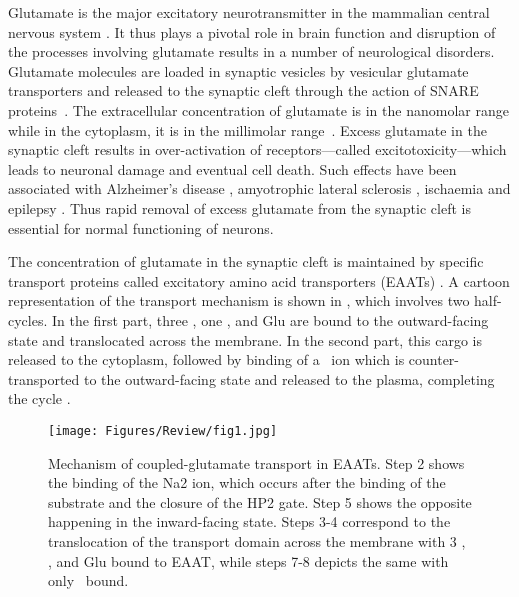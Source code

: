 Glutamate is the major excitatory neurotransmitter in the mammalian central 
nervous system \cite{Danbolt2001}. It thus plays a pivotal role in brain 
function and disruption of the processes involving glutamate results in a 
number of neurological disorders. Glutamate molecules are loaded in synaptic 
vesicles by vesicular glutamate transporters and released to the synaptic cleft 
through the action of SNARE proteins~\cite{ElMestikawy2011}.  The extracellular 
concentration of glutamate is in the nanomolar range while in the cytoplasm, it 
is in the millimolar range~\cite{Herman2007}. Excess glutamate in the synaptic 
cleft results in over-activation of receptors---called excitotoxicity---which 
leads to neuronal damage and eventual cell death. Such effects have been 
associated with Alzheimer's disease \cite{Hynd2004}, amyotrophic lateral 
sclerosis \cite{Rothstein1992}, ischaemia \cite{Rossi2000} and epilepsy 
\cite{During1993}. Thus rapid removal of excess glutamate from the synaptic 
cleft is essential for normal functioning of neurons.

The concentration of glutamate in the synaptic cleft is maintained by specific 
transport proteins called excitatory amino acid transporters (EAATs) 
\cite{Danbolt2001}. A cartoon representation of the transport mechanism is   
shown in , which involves two half-cycles. In the first 
part, three \Na, one \Hi, and Glu are bound to the outward-facing state and 
translocated across the membrane. In the second part, this cargo is released 
to the cytoplasm, followed by binding of a \K\ ion which is counter-transported 
to the outward-facing state and released to the plasma, completing the cycle
\cite{Zerangue1996,Levy1998,Owe2006}.

\begin{figure}[t!]
\centering
\texttt{[image: Figures/Review/fig1.jpg]}
\caption{Mechanism of coupled-glutamate transport in EAATs. Step 2 shows the 
binding of the Na2 ion, which occurs after the binding of the substrate and the 
closure of the HP2 gate. Step 5 shows the opposite happening in the 
inward-facing state. Steps 3-4 correspond to the translocation of the transport 
domain across the membrane with 3 \Na, \Hi, and Glu bound to 
EAAT, while steps 7-8 depicts the same with only \K\ bound. }
\label{review:fig1}
\end{figure}

